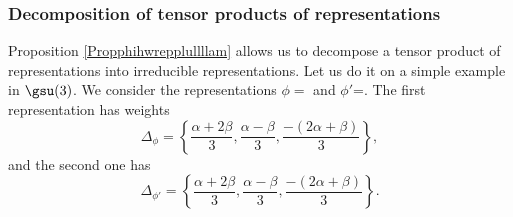 % 

                    \subsubsection{Decomposition of tensor products of representations}


%

% 

%


Proposition \ref{Propphihwrepplullllam} allows us to decompose a tensor product of representations into irreducible representations. Let us do it on a simple example in $\gsu(3)$. We consider the representations $\phi=$ and $\phi'$=. The first representation has weights
\begin{equation}
    \Delta_{\phi}=\left\{ \frac{ \alpha+2\beta }{ 3 },\frac{ \alpha-\beta }{ 3 },\frac{ -(2\alpha+\beta) }{ 3 } \right\},
\end{equation}
and the second one has
\begin{equation}
    \Delta_{\phi'}=\left\{ \frac{ \alpha+2\beta }{ 3 },\frac{ \alpha-\beta }{ 3 },\frac{ -(2\alpha+\beta) }{ 3 } \right\}.
\end{equation}

